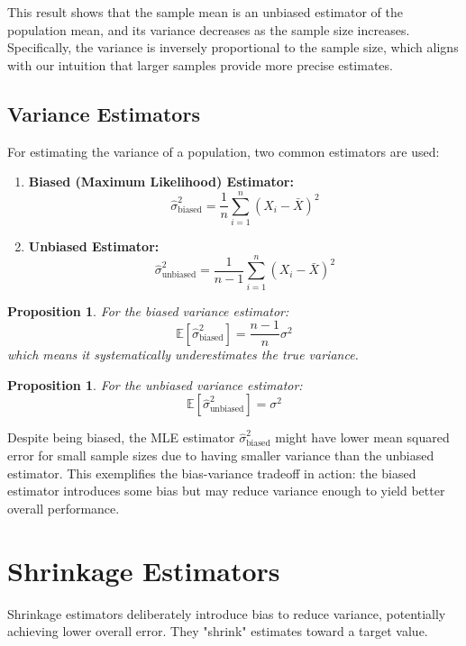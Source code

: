 \documentclass{article}
\newtheorem{proposition}[theorem]{Proposition}
\begin{document}
This result shows that the sample mean is an unbiased estimator of the population mean, and its variance decreases as the sample size increases. Specifically, the variance is inversely proportional to the sample size, which aligns with our intuition that larger samples provide more precise estimates.

\subsection{Variance Estimators}

For estimating the variance of a population, two common estimators are used:

\begin{enumerate}
\item \textbf{Biased (Maximum Likelihood) Estimator:}
\[
\hat{\sigma}^2_{\text{biased}} = \frac{1}{n} \sum_{i=1}^n (X_i - \bar{X})^2
\]

\item \textbf{Unbiased Estimator:}
\[
\hat{\sigma}^2_{\text{unbiased}} = \frac{1}{n-1} \sum_{i=1}^n (X_i - \bar{X})^2
\]
\end{enumerate}

\begin{proposition}
For the biased variance estimator:
\[
\mathbb{E}[\hat{\sigma}^2_{\text{biased}}] = \frac{n-1}{n} \sigma^2
\]
which means it systematically underestimates the true variance.
\end{proposition}

\begin{proposition}
For the unbiased variance estimator:
\[
\mathbb{E}[\hat{\sigma}^2_{\text{unbiased}}] = \sigma^2
\]
\end{proposition}

Despite being biased, the MLE estimator $\hat{\sigma}^2_{\text{biased}}$ might have lower mean squared error for small sample sizes due to having smaller variance than the unbiased estimator. This exemplifies the bias-variance tradeoff in action: the biased estimator introduces some bias but may reduce variance enough to yield better overall performance.

\section{Shrinkage Estimators}

Shrinkage estimators deliberately introduce bias to reduce variance, potentially achieving lower overall error. They "shrink" estimates toward a target value.
\end{document}
